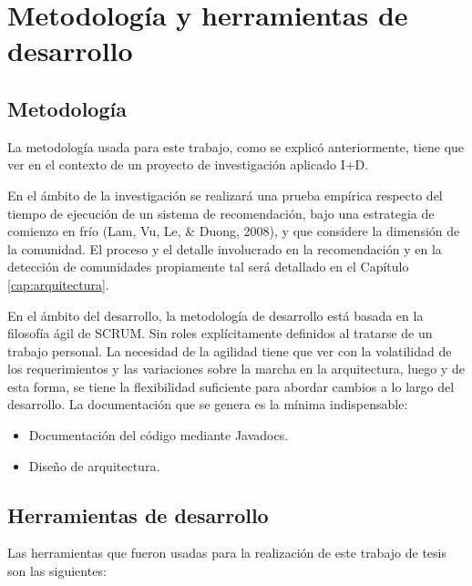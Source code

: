 \section{Metodolog\'ia y herramientas de desarrollo}
\label{intro:metodologia}

\subsection{Metodolog\'ia}
La metodología usada para este trabajo, como se explicó anteriormente, tiene que ver en el contexto de un proyecto de investigación aplicado I+D.

En el ámbito de la investigación se realizará una prueba empírica respecto del tiempo de ejecución de un sistema de recomendación, bajo una estrategia de comienzo en frío (Lam, Vu, Le, & Duong, 2008), y que considere la dimensión de la comunidad. El proceso y el detalle involucrado en la recomendación y en la detección de comunidades propiamente tal será detallado en el Capítulo \ref{cap:arquitectura}.

En el ámbito del desarrollo, la metodología de desarrollo está basada en la filosofía ágil de SCRUM. Sin roles explícitamente definidos al tratarse de un trabajo personal. La necesidad de la agilidad tiene que ver con la volatilidad de los requerimientos y las variaciones sobre la marcha en la arquitectura, luego y de esta forma, se tiene la flexibilidad suficiente para abordar cambios a lo largo del desarrollo. La documentación que se genera es la mínima indispensable:

\begin{itemize}
  \item Documentación del código mediante Javadocs.
  \item Diseño de arquitectura.
\end{itemize}

\subsection{Herramientas de desarrollo}

Las herramientas que fueron usadas para la realización de este trabajo de tesis son las siguientes:

